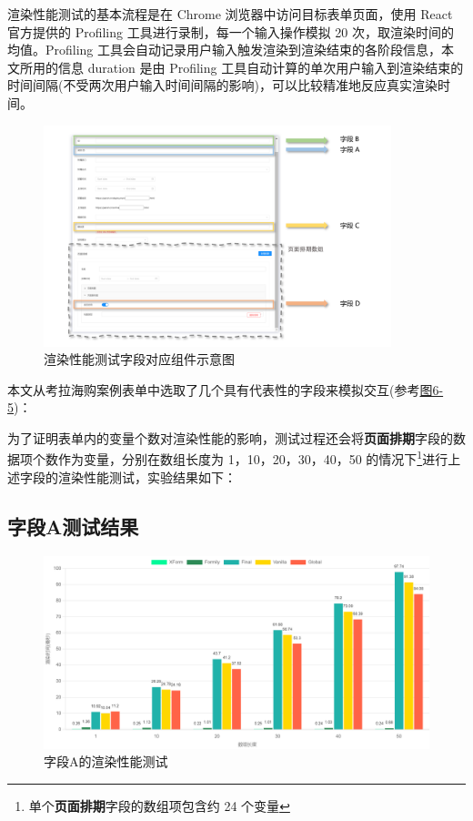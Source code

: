 \documentclass[winfonts,master,twoside]{njuthesis}
\begin{document}
渲染性能测试的基本流程是在 Chrome 浏览器中访问目标表单页面，使用 React 官方提供的 Profiling 工具进行录制，每一个输入操作模拟 20 次，取渲染时间的均值。Profiling 工具会自动记录用户输入触发渲染到渲染结束的各阶段信息，本文所用的信息 duration 是由 Profiling 工具自动计算的单次用户输入到渲染结束的时间间隔(不受两次用户输入时间间隔的影响)，可以比较精准地反应真实渲染时间。

\begin{figure}[h]
    \centering
    \includegraphics[width=0.9\textwidth]{figure/chapter-5/kaola-form-testcase-area-preview.png}
    \caption{渲染性能测试字段对应组件示意图}
    \label{kaola-form-testcase-area-preview}
\end{figure}

本文从考拉海购案例表单中选取了几个具有代表性的字段来模拟交互(参考\hyperref[kaola-form-testcase-area-preview]{图6-5})：



为了证明表单内的变量个数对渲染性能的影响，测试过程还会将\textbf{页面排期}字段的数据项个数作为变量，分别在数组长度为 1，10，20，30，40，50 的情况下\footnote{单个\textbf{页面排期}字段的数组项包含约 24 个变量}进行上述字段的渲染性能测试，实验结果如下：

\subsection{字段A测试结果}

\begin{figure}[h]
    \centering
    \includegraphics[width=\textwidth]{figure/chapter-5/A-update.png}
    \caption{字段A的渲染性能测试}
    \label{render-performence-testcase-A}
\end{figure}
\end{document}
